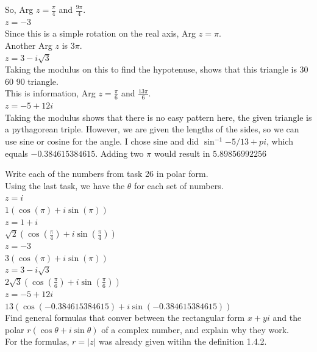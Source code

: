 \documentclass[12pt]{article}
\begin{document}
So, Arg $z = \frac{\pi}{4}$ and $\frac{9\pi}{4}$.\\

 $z = -3$\\
Since this is a simple rotation on the real axis, Arg $z = \pi$.\\
Another Arg $z$ is $3\pi$.\\

 $z = 3 - i\sqrt{3}$\\
Taking the modulus on this to find the hypotenuse, shows that this triangle is 30 60 90 triangle.\\
This is information, Arg $z = \frac{\pi}{6}$ and $\frac{13\pi}{6}$.\\


 $z = -5 + 12i$\\
Taking the modulus shows that there is no easy pattern here, the given triangle is a pythagorean triple.
However, we are given the lengths of the sides, so we can use sine or cosine for the angle. 
I chose sine and did $\sin^{-1}{-5/13} + pi$, which equals $-0.384615384615$.
Adding two $\pi$ would result in $5.89856992256$


 Write each of the numbers from task 26 in polar form.\\
Using the last task, we have the $\theta$ for each set of numbers.\\


 $z = i$\\
$1(\cos(\pi) + i\sin(\pi))$\\


 $z = 1 + i$\\
$\sqrt{2}(\cos(\frac{\pi}{4}) + i\sin(\frac{\pi}{4}))$\\


 $z = -3$\\
$3(\cos(\pi) + i\sin(\pi))$\\


 $z = 3 - i\sqrt{3}$\\
$2\sqrt{3}(\cos(\frac{\pi}{6}) + i\sin(\frac{\pi}{6}))$\\


 $z = -5 + 12i$\\
$13(\cos(-0.384615384615) + i\sin(-0.384615384615))$\\


 Find general formulas that conver between the rectangular form $x + yi$ and the polar $r(\cos\theta + i\sin\theta)$ of a complex number, and explain why they work.\\
For the formulas, $r = |z|$ was already given witihn the definition 1.4.2.\\
\end{document}
